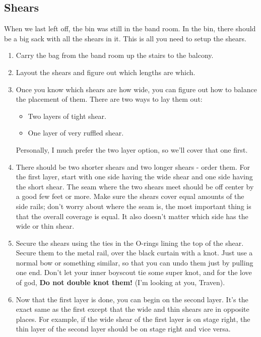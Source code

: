 \documentclass[11pt,a4paper]{book}
\begin{document}
\subsection{Shears}
When we last left off, the bin was still in the band room. In the bin, there should be a big sack with all the shears in it. This is all you need to setup the shears.
\begin{enumerate}
\item Carry the bag from the band room up the stairs to the balcony.
\item Layout the shears and figure out which lengths are which.
\item Once you know which shears are how wide, you can figure out how to balance the placement of them. There are two ways to lay them out: 
\begin{itemize}
\item Two layers of tight shear.
\item One layer of very ruffled shear. 
\end{itemize}

Personally, I much prefer the two layer option, so we'll cover that one first. 

\item There should be two shorter shears and two longer shears - order them. For the first layer, start with one side having the wide shear and one side having the short shear. The seam where the two shears meet should be off center by a good few feet or more. Make sure the shears cover equal amounts of the side rails; don't worry about where the seam is, the most important thing is that the overall coverage is equal. It also doesn't matter which side has the wide or thin shear.
\item Secure the shears using the ties in the O-rings lining the top of the shear. Secure them to the metal rail, over the black curtain with a knot. Just use a normal bow or something similar, so that you can undo them just by pulling one end. Don't let your inner boyscout tie some super knot, and for the love of god, \textbf{Do not double knot them!} (I'm looking at you, Traven).
\item Now that the first layer is done, you can begin on the second layer. It's the exact same as the first except that the wide and thin shears are in opposite places. For example, if the wide shear of the first layer is on stage right, the thin layer of the second layer should be on stage right and vice versa.  
\end{enumerate}
\end{document}
